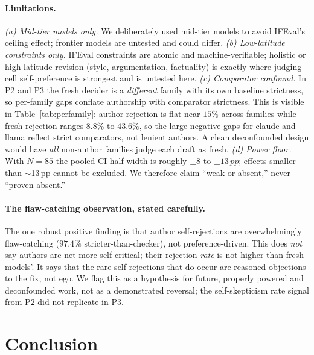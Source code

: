 \documentclass[11pt]{article}
\newcommand{\pp}{\,pp}
\begin{document}
\paragraph{Limitations.} \emph{(a) Mid-tier models only.} We deliberately used mid-tier models to
avoid IFEval's ceiling effect; frontier models are untested and could differ. \emph{(b) Low-latitude
constraints only.} IFEval constraints are atomic and machine-verifiable; holistic or high-latitude
revision (style, argumentation, factuality) is exactly where judging-cell self-preference is
strongest and is untested here. \emph{(c) Comparator confound.} In P2 and P3 the fresh decider is a
\emph{different} family with its own baseline strictness, so per-family gaps conflate authorship
with comparator strictness. This is visible in Table~\ref{tab:perfamily}: author rejection is flat
near $15\%$ across families while fresh rejection ranges $8.8\%$ to $43.6\%$, so the large negative
gaps for claude and llama reflect strict comparators, not lenient authors. A clean deconfounded
design would have \emph{all} non-author families judge each draft as fresh. \emph{(d) Power floor.}
With $N=85$ the pooled CI half-width is roughly $\pm 8$ to $\pm 13\pp$; effects smaller than
$\sim$13\pp{} cannot be excluded. We therefore claim ``weak or absent,'' never ``proven absent.''

\paragraph{The flaw-catching observation, stated carefully.} The one robust positive finding is
that author self-rejections are overwhelmingly flaw-catching ($97.4\%$ stricter-than-checker), not
preference-driven. This does \emph{not} say authors are net more self-critical; their rejection
\emph{rate} is not higher than fresh models'. It says that the rare self-rejections that do occur
are reasoned objections to the fix, not ego. We flag this as a hypothesis for future, properly
powered and deconfounded work, not as a demonstrated reversal; the self-skepticism rate signal from
P2 did not replicate in P3.

\section{Conclusion}
\end{document}
